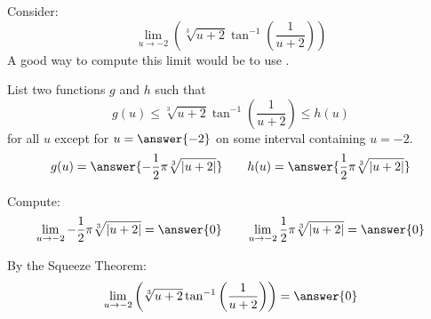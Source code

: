 \documentclass{ximera}
\author{Bart Snapp}
\begin{document}
\begin{exercise}


Consider:
\[
\lim_{u\to -2} \left(\sqrt[3]{u+2} \tan ^{-1}\left(\frac{1}{u+2}\right)\right)
\]
A good way to compute this limit would be to use .
\begin{exercise}
List two functions $g$ and $h$ such that
\[
g(u)\le \sqrt[3]{u+2} \tan ^{-1}\left(\frac{1}{u+2}\right) \le h(u)
\]
for all $u$ except for $u=\answer{-2}$ on some interval containing $u=-2$.
\[
g(u)=\answer{-\frac{1}{2} \pi  \sqrt[3]{\left| u+2\right| }}\qquad h(u) =\answer{\frac{1}{2} \pi  \sqrt[3]{\left| u+2\right| }}
\]
\begin{exercise}
Compute:
\[
\lim_{u \to -2}-\frac{1}{2} \pi  \sqrt[3]{\left| u+2\right| } = \answer{0}\qquad \lim_{u\to -2}\frac{1}{2} \pi  \sqrt[3]{\left| u+2\right| } = \answer{0}
\]
\begin{exercise}
By the Squeeze Theorem:
\[
\lim_{u\to -2} \left(\sqrt[3]{u+2} \tan ^{-1}\left(\frac{1}{u+2}\right)\right) = \answer{0}
\]
\end{exercise}
\end{exercise}
\end{exercise}
\end{exercise}
\end{document}
